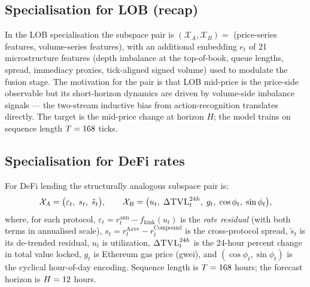 \subsection{Specialisation for LOB (recap)}
\label{sec:methodology-lob}

In the LOB specialisation \cite{solovev2026lob} the subspace pair is
$(\mathcal{X}_A, \mathcal{X}_B) = $ (price-series features,
volume-series features), with an additional embedding $e_t$ of 21
microstructure features (depth imbalance at the top-of-book, queue
lengths, spread, immediacy proxies, tick-aligned signed volume) used to
modulate the fusion stage. The motivation for the pair is that LOB
mid-price is the price-side observable but its short-horizon dynamics
are driven by volume-side imbalance signals --- the two-stream
inductive bias from action-recognition translates directly. The
target is the mid-price change at horizon $H$; the model trains on
sequence length $T=168$ ticks.

\subsection{Specialisation for DeFi rates}
\label{sec:methodology-defi}

For DeFi lending the structurally analogous subspace pair is:
\begin{equation}
\mathcal{X}_A = \bigl(\varepsilon_t,\;
                 s_t,\;
                 \tilde{s}_t \bigr),\qquad
\mathcal{X}_B = \bigl(u_t,\;
                  \Delta\textsc{TVL}_t^{24h},\;
                  g_t,\;
                  \cos\phi_t,\;\sin\phi_t \bigr),
\label{eq:defi-pair}
\end{equation}
where, for each protocol,
$\varepsilon_t = r_t^{\text{ann}} - f_{\text{kink}}(u_t)$ is the
\emph{rate residual} (with both terms in annualised scale),
$s_t = r_t^{\text{Aave}} - r_t^{\text{Compound}}$ is the
cross-protocol spread, $\tilde{s}_t$ is its de-trended residual,
$u_t$ is utilization, $\Delta\textsc{TVL}_t^{24h}$ is the 24-hour
percent change in total value locked, $g_t$ is Ethereum gas price
(gwei), and $(\cos\phi_t, \sin\phi_t)$ is the cyclical hour-of-day
encoding.  Sequence length is $T=168$ hours; the forecast horizon
is $H=12$ hours.

